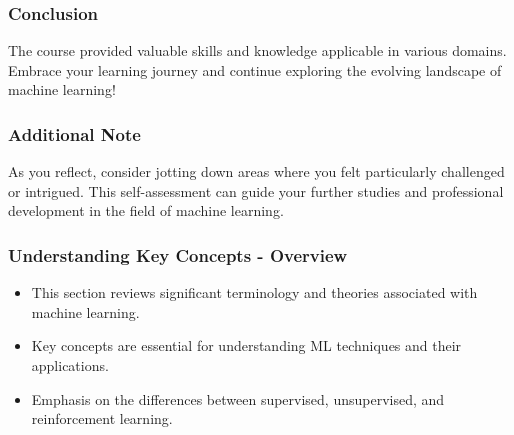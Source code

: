 \documentclass[aspectratio=169]{beamer}
\begin{document}
\begin{frame}[fragile]
    \frametitle{Conclusion}
    The course provided valuable skills and knowledge applicable in various domains. Embrace your learning journey and continue exploring the evolving landscape of machine learning!
\end{frame}

\begin{frame}[fragile]
    \frametitle{Additional Note}
    As you reflect, consider jotting down areas where you felt particularly challenged or intrigued. This self-assessment can guide your further studies and professional development in the field of machine learning.
\end{frame}

\begin{frame}[fragile]
    \frametitle{Understanding Key Concepts - Overview}
    \begin{itemize}
        \item This section reviews significant terminology and theories associated with machine learning.
        \item Key concepts are essential for understanding ML techniques and their applications.
        \item Emphasis on the differences between supervised, unsupervised, and reinforcement learning.
    \end{itemize}
\end{frame}
\end{document}

